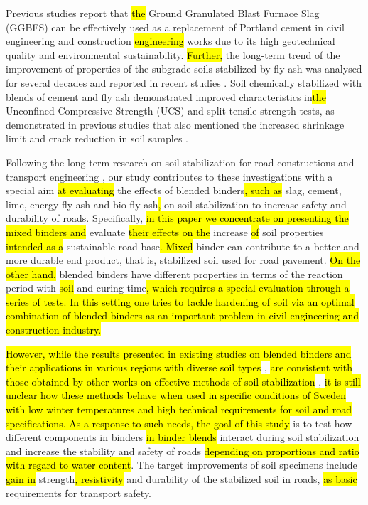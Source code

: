 \documentclass[constrmater,article,submit,pdftex,moreauthors]{Definitions/mdpi}
\begin{document}
Previous studies report\hl{ }\cite{Higgins,electronics11223726} that \hl{the }Ground Granulated Blast Furnace Slag (GGBFS) can be effectively used as a replacement of Portland cement in civil engineering and construction \hl{engineering }works due to its high geotechnical quality and environmental sustainability. \hl{Further, }the long-term trend of the improvement of properties of the subgrade soils stabilized by fly ash was analysed for several decades and reported in recent studies \cite{Parsons}. Soil chemically stabilized with blends of cement and fly ash demonstrated improved characteristics in\hl{the }Unconfined Compressive Strength (UCS) and split tensile strength tests, as demonstrated in previous studies that also mentioned the increased shrinkage limit and crack reduction in soil samples \cite{Olgun}.

Following the long-term research on soil stabilization for road constructions and transport engineering \citep{Bjerrum,Celauro,Glossop,Markwick,Nelson,Olsenetal2022,Sear}, our study contributes to these investigations with a special aim \hl{at evaluating} the effects of blended binders\hl{, such as }slag, cement, lime, energy fly ash and bio fly ash\hl{, }on soil stabilization to increase safety and durability of roads. Specifically, \hl{in this paper we concentrate on presenting the mixed binders and }evaluate\hl{ their effects on the} increase \hl{of }soil properties \hl{intended as a }sustainable road base\hl{. Mixed }binder can contribute to a better and more durable end product, that is, stabilized soil used for road pavement. \hl{On the other hand,} blended binders have different properties in terms of the reaction period with \hl{soil} and curing time\hl{, which requires a special evaluation through a series of tests. In this setting one tries to tackle hardening of soil via an optimal combination of blended binders as an important problem in civil engineering and construction industry. }

\hl{However, while the results presented in existing studies on blended binders and their applications in various regions with diverse soil types} \cite{Jie,Holz,Jamnongpipatkul}, \hl{are consistent with those obtained by other works on effective methods of soil stabilization} \cite{Moh}, \hl{it is still unclear how these methods behave when used in specific conditions of Sweden with low winter temperatures and high technical requirements for soil and road specifications. As a response to such needs, the goal of this study }is to test how different components in binders\hl{ in binder blends }interact during soil stabilization and increase the stability and safety of roads\hl{ depending on proportions and ratio with regard to water content}. The target\hl{ }improvements of soil specimens include \hl{gain in }strength\hl{, resistivity} and durability of the stabilized soil in roads, \hl{as basic }requirements for transport safety.
\end{document}
